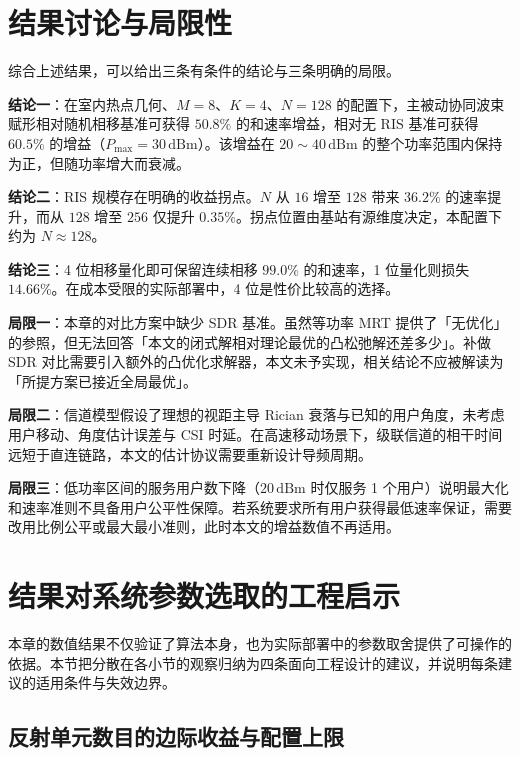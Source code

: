 \section{结果讨论与局限性}
\label{sec:discussion}

综合上述结果，可以给出三条有条件的结论与三条明确的局限。

\textbf{结论一}：在室内热点几何、$M=8$、$K=4$、$N=128$ 的配置下，主被动协同波束赋形相对随机相移基准可获得 $50.8\%$ 的和速率增益，相对无 RIS 基准可获得 $60.5\%$ 的增益（$P_{\max}=30\,\mathrm{dBm}$）。该增益在 $20\sim40\,\mathrm{dBm}$ 的整个功率范围内保持为正，但随功率增大而衰减。

\textbf{结论二}：RIS 规模存在明确的收益拐点。$N$ 从 $16$ 增至 $128$ 带来 $36.2\%$ 的速率提升，而从 $128$ 增至 $256$ 仅提升 $0.35\%$。拐点位置由基站有源维度决定，本配置下约为 $N\approx128$。

\textbf{结论三}：4 位相移量化即可保留连续相移 $99.0\%$ 的和速率，1 位量化则损失 $14.66\%$。在成本受限的实际部署中，4 位是性价比较高的选择。

\textbf{局限一}：本章的对比方案中缺少 SDR 基准。虽然等功率 MRT 提供了「无优化」的参照，但无法回答「本文的闭式解相对理论最优的凸松弛解还差多少」。补做 SDR 对比需要引入额外的凸优化求解器，本文未予实现，相关结论不应被解读为「所提方案已接近全局最优」。

\textbf{局限二}：信道模型假设了理想的视距主导 Rician 衰落与已知的用户角度，未考虑用户移动、角度估计误差与 CSI 时延。在高速移动场景下，级联信道的相干时间远短于直连链路，本文的估计协议需要重新设计导频周期。

\textbf{局限三}：低功率区间的服务用户数下降（$20\,\mathrm{dBm}$ 时仅服务 1 个用户）说明最大化和速率准则不具备用户公平性保障。若系统要求所有用户获得最低速率保证，需要改用比例公平或最大最小准则，此时本文的增益数值不再适用。

\section{结果对系统参数选取的工程启示}
\label{sec:design_guidance}

本章的数值结果不仅验证了算法本身，也为实际部署中的参数取舍提供了可操作的依据。本节把分散在各小节的观察归纳为四条面向工程设计的建议，并说明每条建议的适用条件与失效边界。

\subsection{反射单元数目的边际收益与配置上限}
\label{sec:guidance_n}

